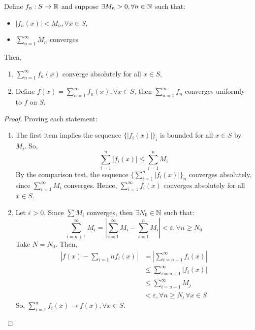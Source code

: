 \begin{theorem}
    Define $f_n: S \to \mathbb{R}$ and suppose $\exists M_n > 0, \forall n \in \mathbb{N}$ such that:
    \begin{itemize}
        \item $|f_n(x)| < M_n, \forall x \in S$,
        \item $\sum_{n=1}^\infty M_n$ converges
    \end{itemize}
    Then,
    \begin{enumerate}
        \item $\sum_{n=1}^\infty f_n(x)$ converge absolutely for all $x \in S$,
        \item Define $f(x) = \sum_{n = 1}^\infty f_n(x), \forall x \in S$, then $\sum_{n=1}^\infty f_n$ converges uniformly to $f$ on $S$.
    \end{enumerate}
\end{theorem}

\begin{proof}
    Proving each statement:
    \begin{enumerate}
        \item The first item implies the sequence $\{|f_i(x)|\}_i$ is bounded for all $x \in S$ by $M_i$. So,
            \begin{equation*}
                \sum \limits_{i=1}^n |f_i(x)| \leq \sum \limits_{i=1}^n M_i
            \end{equation*}
        By the comparison test, the sequence $\{\sum_{i=1}^n |f_i(x)|\}_n$ converges absolutely, since $\sum_{i=1}^\infty M_i$ converges. Hence, $\sum_{i=1}^\infty f_i(x)$ converges absolutely for all $ x \in S$.
        \item Let $\varepsilon > 0$. Since $\sum M_i$ converges, then $\exists N_0 \in \mathbb{N}$ such that:
            \begin{equation*}
                \sum \limits_{i = n+1}^\infty M_i = \left |
                    \sum \limits_{i = 1}^\infty M_i
                    - \sum \limits_{i = 1}^n M_i
                \right | < \varepsilon, \forall n \geq N_0
            \end{equation*}
            Take $N = N_0$. Then,
            \begin{align*}
                \left |
                    f(x) - \sum \limits_{i = 1}n f_i(x)
                \right |
                &= \left |
                    \sum \limits_{i = n+1}^\infty f_i(x)
                \right | \\
                &\leq \sum \limits_{i = n+1}^\infty |f_i(x)| \\
                &\leq \sum \limits_{i = n+1}^\infty M_j \\
                &< \varepsilon, \forall n \geq N, \forall x \in S
            \end{align*}
            So, $\sum_{i=1}^n f_i(x) \to f(x), \forall x \in S$.
    \end{enumerate}
\end{proof}

